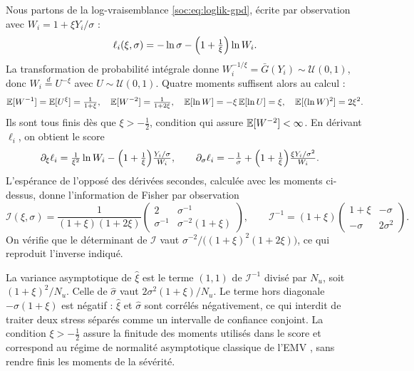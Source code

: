 Nous partons de la log-vraisemblance \eqref{soc:eq:loglik-gpd}, écrite par observation avec
$W_i=1+\xi Y_i/\sigma$ :
\begin{equation}
\ell_i(\xi,\sigma)=-\ln\sigma-\Bigl(1+\tfrac1\xi\Bigr)\ln W_i.
\end{equation}
La transformation de probabilité intégrale donne $W_i^{-1/\xi}=\bar G(Y_i)\sim\mathcal U(0,1)$, donc
$W_i\overset{d}{=}U^{-\xi}$ avec $U\sim\mathcal U(0,1)$. Quatre moments suffisent alors au calcul :
\begin{equation}
\mathbb{E}[W^{-1}]=\mathbb{E}[U^{\xi}]=\tfrac{1}{1+\xi},\quad
\mathbb{E}[W^{-2}]=\tfrac{1}{1+2\xi},\quad
\mathbb{E}[\ln W]=-\xi\,\mathbb{E}[\ln U]=\xi,\quad
\mathbb{E}[(\ln W)^2]=2\xi^2.
\end{equation}
Ils sont tous finis dès que $\xi>-\tfrac12$, condition qui assure $\mathbb{E}[W^{-2}]<\infty$. En dérivant $\ell_i$,
on obtient le score
\begin{align*}
\partial_\xi\ell_i&=\tfrac{1}{\xi^2}\ln W_i-\Bigl(1+\tfrac1\xi\Bigr)\tfrac{Y_i/\sigma}{W_i},\qquad
\partial_\sigma\ell_i=-\tfrac1\sigma+\Bigl(1+\tfrac1\xi\Bigr)\tfrac{\xi Y_i/\sigma^2}{W_i}.
\end{align*}
L'espérance de l'opposé des dérivées secondes, calculée avec les moments ci-dessus, donne l'information de
Fisher par observation
\begin{equation}
\mathcal{I}(\xi,\sigma)=\frac{1}{(1+\xi)(1+2\xi)}\begin{pmatrix} 2 & \sigma^{-1}\\[2pt] \sigma^{-1} & \sigma^{-2}(1+\xi)\end{pmatrix},\qquad
\mathcal{I}^{-1}=(1+\xi)\begin{pmatrix} 1+\xi & -\sigma\\[2pt] -\sigma & 2\sigma^2\end{pmatrix}.
\end{equation}
On vérifie que le déterminant de $\mathcal I$ vaut $\sigma^{-2}/\bigl((1+\xi)^2(1+2\xi)\bigr)$, ce qui
reproduit l'inverse indiqué.

La variance asymptotique de $\hat\xi$ est le terme $(1,1)$ de $\mathcal I^{-1}$ divisé par $N_u$, soit
$(1+\xi)^2/N_u$. Celle de $\hat\sigma$ vaut $2\sigma^2(1+\xi)/N_u$. Le terme hors diagonale
$-\sigma(1+\xi)$ est négatif : $\hat\xi$ et $\hat\sigma$ sont corrélés négativement, ce qui interdit
de traiter deux stress séparés comme un intervalle de confiance conjoint. La
condition $\xi>-\tfrac12$ assure la finitude des moments utilisés dans le score et correspond au régime
de normalité asymptotique classique de l'EMV \citep{smith1987}, sans rendre finis les moments de la sévérité.

